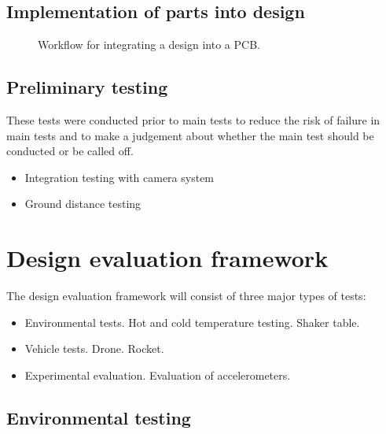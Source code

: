 \documentclass[a4paper,11pt]{article}
\begin{document}
\subsection{Implementation of parts into design}

\begin{figure}[H]
  \centering
  
  \caption{Workflow for integrating a design into a PCB.}
  \label{fig:ecad-workflow}
\end{figure}


\subsection{Preliminary testing}

These tests were conducted prior to main tests to reduce the risk of failure in main tests and to make a judgement about whether the main test should be conducted or be called off.

\begin{itemize}
  \item Integration testing with camera system %
  \item Ground distance testing %
\end{itemize}

\section{Design evaluation framework}

The design evaluation framework will consist of three major types of tests:

\begin{itemize}
  \item Environmental tests.
  \subitem Hot and cold temperature testing.
  \subitem Shaker table.
  \item Vehicle tests.
  \subitem Drone.
  \subitem Rocket.
  \item Experimental evaluation.
  \subitem Evaluation of accelerometers.
\end{itemize}

\subsection{Environmental testing}
\end{document}

